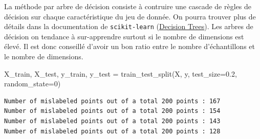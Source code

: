 \documentclass[
]{article}
\newenvironment{Shaded}{}{}
\newcommand{\DecValTok}[1]{\textcolor[rgb]{0.25,0.63,0.44}{#1}}
\newcommand{\FloatTok}[1]{\textcolor[rgb]{0.25,0.63,0.44}{#1}}
\newcommand{\NormalTok}[1]{#1}
\newcommand{\OperatorTok}[1]{\textcolor[rgb]{0.40,0.40,0.40}{#1}}
\begin{document}
La méthode par arbre de décision consiste à contruire une cascade de
règles de décision sur chaque caractéristique du jeu de donnée. On
pourra trouver plus de détails dans la documentation de
\texttt{scikit-learn}
(\href{https://scikit-learn.org/stable/modules/tree.html}{Decision
Trees}). Les arbres de décision on tendance à sur-apprendre surtout si
le nombre de dimensions est élevé. Il est donc conseillé d'avoir un bon
ratio entre le nombre d'échantillons et le nombre de dimensions.

\label{694d96e4}
\label{cb36}
\begin{Shaded}
\begin{Highlighting}[]
\NormalTok{X\_train, X\_test, y\_train, y\_test }\OperatorTok{=}\NormalTok{ train\_test\_split(X, y, test\_size}\OperatorTok{=}\FloatTok{0.2}\NormalTok{, random\_state}\OperatorTok{=}\DecValTok{0}\NormalTok{)}
\end{Highlighting}
\end{Shaded}

\label{a47dcffd}
\begin{verbatim}
Number of mislabeled points out of a total 200 points : 167
Number of mislabeled points out of a total 200 points : 154
Number of mislabeled points out of a total 200 points : 143
Number of mislabeled points out of a total 200 points : 128
\end{verbatim}
\end{document}
